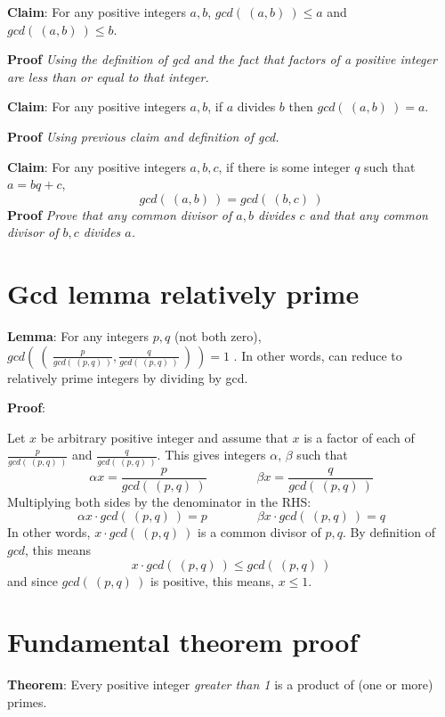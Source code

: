 \documentclass[12pt, oneside]{article}
\begin{document}
{\bf Claim}: For any positive integers $a,b$, $gcd(~(a,b)~) \leq a$ and $gcd( ~(a,b)~) \leq b$.

{\bf Proof} {\it Using the definition of gcd and the fact that factors of a positive integer
are less than or equal to that integer.}

\vspace{150pt}

{\bf Claim}: For any positive integers $a,b$, if $a$ divides $b$ then $gcd(~(a,b)~) = a$.

{\bf Proof} {\it Using previous claim and definition of gcd.}

\vspace{150pt}


{\bf Claim}: For any positive integers $a,b,c$, if there is some integer $q$ such that $a = bq + c$,
\[
    gcd(~(a,b)~) = gcd (~(b,c)~)
\]
{\bf Proof} {\it Prove that any common divisor of $a,b$ divides $c$ and that any common 
divisor of $b,c$ divides $a$.}

\vspace{150pt}
 \vfill
\section*{Gcd lemma relatively prime}


{\bf Lemma}: For any integers $p, q$ (not both zero), 
$gcd \left(~ \left(~\frac{p}{gcd(~(p,q)~)}, \frac{q}{gcd(~(p,q)~)} ~\right) ~\right) = 1$ .
In other words, can reduce to relatively prime integers by dividing by gcd.

{\bf Proof}:

Let $x$ be arbitrary positive integer and assume that $x$ is a 
factor of each of $\frac{p}{gcd(~(p,q)~)}$ and $\frac{q}{gcd(~(p,q)~)}$. 
This gives integers $\alpha$, $\beta$ such that 
\[
    \alpha x = \frac{p}{gcd(~(p,q)~)} \qquad \qquad \beta x = \frac{q}{gcd(~(p,q)~)}
\]
Multiplying both sides by the denominator in the RHS: 
\[
    \alpha x \cdot gcd(~(p,q)~)= p \qquad \qquad \beta x \cdot gcd(~(p,q)~)= q
\]
In other words, $x \cdot gcd(~(p,q)~)$ is a common divisor of $p, q$. By definition of $gcd$, this means
\[
    x \cdot gcd (~(p,q)~) \leq gcd (~(p,q)~)
\]
and since $gcd(~(p,q)~)$ is positive, this means, $x \leq 1$.
\vspace{350pt}
 \vfill
\section*{Fundamental theorem proof}


{\bf Theorem}: Every positive integer {\it greater than 1} is a product of (one or more) primes.
\end{document}
